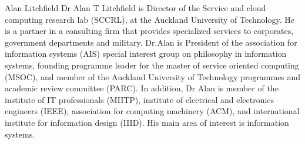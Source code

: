 \documentclass{ieeeaccess}
\begin{document}
\begin{IEEEbiography}{Alan Litchfield} Dr Alan T Litchfield is Director of the Service and cloud computing research lab (SCCRL), at the Auckland University of Technology. He is a partner in a consulting firm that provides specialized services to corporates, government departments and military. Dr.Alan is President of the association for information systems (AIS) special interest group on philosophy in information systems, founding programme leader for the master of service oriented computing (MSOC), and member of the Auckland University of Technology programmes and academic review committee (PARC). In addition, Dr Alan is member of the institute of IT professionals (MIITP), institute of electrical and electronics engineers (IEEE), association for computing machinery (ACM), and international institute for information design (IIID). His main area of interest is information systems.
\end{IEEEbiography}

\EOD
\end{document}
